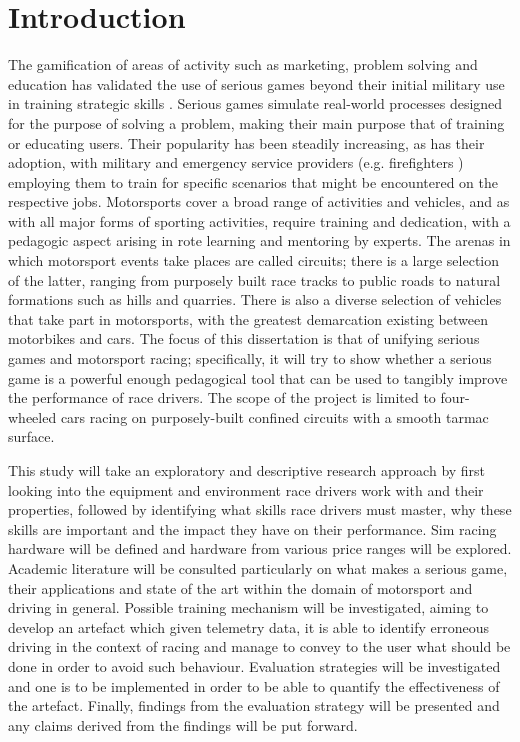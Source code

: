 \chapter{Introduction}

The gamification of areas of activity such as marketing, problem solving and education \cite{michael2005serious} has validated the use of serious games beyond their initial military use in training strategic skills \cite{djaouti2011classifying}.  Serious games simulate real-world processes designed for the purpose of solving a problem, making their main purpose that of training or educating users. Their popularity has been steadily increasing, as has their adoption, with military \cite{djaouti2011classifying} and emergency service providers (e.g. firefighters \cite{michael2005serious}) employing them to train for specific scenarios that might be encountered on the respective jobs. Motorsports cover a broad range of activities and vehicles, and as with all major forms of sporting activities, require training and dedication, with a pedagogic aspect arising in rote learning and mentoring by experts. The arenas in which motorsport events take places are called circuits; there is a large selection of the latter, ranging from purposely built race tracks to public roads to natural formations such as hills and quarries. There is also a diverse selection of vehicles that take part in motorsports, with the greatest demarcation existing between motorbikes and cars. The focus of this dissertation is that of unifying serious games and motorsport racing; specifically, it will try to show whether a serious game is a powerful enough pedagogical tool that can be used to tangibly improve the performance of race drivers. The scope of the project is limited to four-wheeled cars racing on purposely-built confined circuits with a smooth tarmac surface.  

This study will take an exploratory and descriptive research approach by first looking into the equipment and environment race drivers work with and their properties, followed by identifying what skills race drivers must master, why these skills are important and the impact they have on their performance. Sim racing hardware will be defined and hardware from various price ranges will be explored. Academic literature will be consulted particularly on what makes a serious game, their applications and state of the art within the domain of motorsport and driving in general. Possible training mechanism will be investigated, aiming to develop an artefact which given telemetry data, it is able to identify erroneous driving in the context of racing and manage to convey to the user what should be done in order to avoid such behaviour.  Evaluation strategies will be investigated and one is to be implemented in order to be able to quantify the effectiveness of the artefact. Finally, findings from the evaluation strategy will be presented and any claims derived from the findings will be put forward.